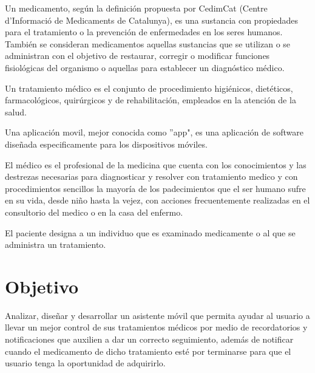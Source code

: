 Un medicamento, según la definición propuesta por CedimCat (Centre d'Informació de Medicaments de Catalunya)\cite{Referencia5}, es una sustancia con propiedades para el tratamiento o la prevención de enfermedades en los seres humanos. También se consideran medicamentos aquellas sustancias que se utilizan o se administran con el objetivo de restaurar, corregir o modificar funciones fisiológicas del organismo o aquellas para establecer un diagnóstico médico.

Un tratamiento médico es el conjunto de procedimiento higiénicos, dietéticos, farmacológicos, quirúrgicos y de rehabilitación, empleados en la atención de la salud\cite{Referencia6}.

Una aplicación movil, mejor conocida como ''app", es una aplicación de software diseñada especificamente para los dispositivos móviles\cite{Referencia7}.

El médico es el profesional de la medicina que cuenta con los conocimientos y las destrezas necesarias para diagnosticar y resolver con tratamiento medico y con procedimientos sencillos la mayoría de los padecimientos que el ser humano sufre en su vida, desde niño hasta la vejez, con acciones frecuentemente realizadas en el consultorio del medico o en la casa del enfermo\cite{Referencia8}.

El paciente designa a un individuo que es examinado medicamente o al que se administra un tratamiento\cite{Referencia9}.

%
%
%

\section{Objetivo}
Analizar, diseñar y desarrollar un asistente móvil que permita ayudar al usuario a llevar un mejor control de sus tratamientos médicos por medio de recordatorios y notificaciones que auxilien a dar un correcto seguimiento, además de notificar cuando el medicamento de dicho tratamiento esté por terminarse para que el usuario tenga la oportunidad de adquirirlo.

